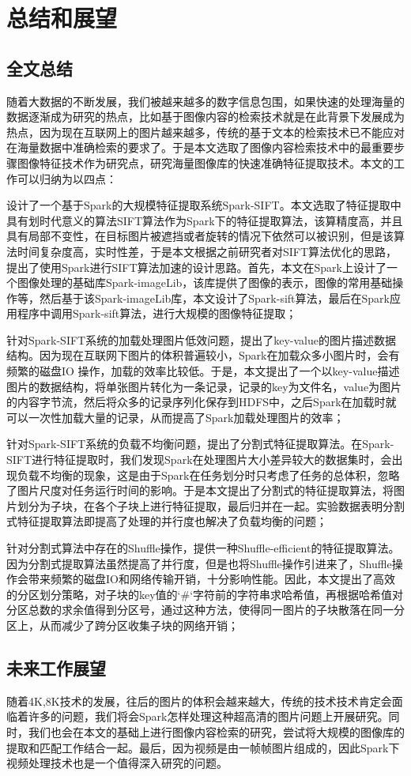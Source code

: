 ﻿\chapter{总结和展望}
\section{全文总结}
随着大数据的不断发展，我们被越来越多的数字信息包围，如果快速的处理海量的数据逐渐成为研究的热点，比如基于图像内容的检索技术就是在此背景下发展成为热点，因为现在互联网上的图片越来越多，传统的基于文本的检索技术已不能应对在海量数据中准确检索的要求了。于是本文选取了图像内容检索技术中的最重要步骤图像特征技术作为研究点，研究海量图像库的快速准确特征提取技术。本文的工作可以归纳为以四点：
\begin{compactenum}
\item 设计了一个基于Spark的大规模特征提取系统Spark-SIFT。本文选取了特征提取中具有划时代意义的算法SIFT算法作为Spark下的特征提取算法，该算精度高，并且具有局部不变性，在目标图片被遮挡或者旋转的情况下依然可以被识别，但是该算法时间复杂度高，实时性差，于是本文根据之前研究者对SIFT算法优化的思路，提出了使用Spark进行SIFT算法加速的设计思路。首先，本文在Spark上设计了一个图像处理的基础库Spark-imageLib，该库提供了图像的表示，图像的常用基础操作等，然后基于该Spark-imageLib库，本文设计了Spark-sift算法，最后在Spark应用程序中调用Spark-sift算法，进行大规模的图像特征提取；
\item 针对Spark-SIFT系统的加载处理图片低效问题，提出了key-value的图片描述数据结构。因为现在互联网下图片的体积普遍较小，Spark在加载众多小图片时，会有频繁的磁盘IO 操作，加载的效率比较低。于是，本文提出了一个以key-value描述图片的数据结构，将单张图片转化为一条记录，记录的key为文件名，value为图片的内容字节流，然后将众多的记录序列化保存到HDFS中，之后Spark在加载时就可以一次性加载大量的记录，从而提高了Spark加载处理图片的效率；
\item 针对Spark-SIFT系统的负载不均衡问题，提出了分割式特征提取算法。在Spark-SIFT进行特征提取时，我们发现Spark在处理图片大小差异较大的数据集时，会出现负载不均衡的现象，这是由于Spark在任务划分时只考虑了任务的总体积，忽略了图片尺度对任务运行时间的影响。于是本文提出了分割式的特征提取算法，将图片划分为子块，在各个子块上进行特征提取，最后归并在一起。实验数据表明分割式特征提取算法即提高了处理的并行度也解决了负载均衡的问题；
\item 针对分割式算法中存在的Shuffle操作，提供一种Shuffle-efficient的特征提取算法。因为分割式提取算法虽然提高了并行度，但是也将Shuffle操作引进来了，Shuffle操作会带来频繁的磁盘IO和网络传输开销，十分影响性能。因此，本文提出了高效的分区划分策略，对子块的key值的`\#`字符前的字符串求哈希值，再根据哈希值对分区总数的求余值得到分区号，通过这种方法，使得同一图片的子块散落在同一分区上，从而减少了跨分区收集子块的网络开销；
\end{compactenum}
\section{未来工作展望}
随着4K,8K技术的发展，往后的图片的体积会越来越大，传统的技术技术肯定会面临着许多的问题，我们将会Spark怎样处理这种超高清的图片问题上开展研究。同时，我们也会在本文的基础上进行图像内容检索的研究，尝试将大规模的图像库的提取和匹配工作结合一起。最后，因为视频是由一帧帧图片组成的，因此Spark下视频处理技术也是一个值得深入研究的问题。
